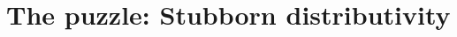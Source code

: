 \documentclass[linguex]{sp}
\begin{document}
\section{The puzzle: Stubborn distributivity}

%
%
%
%
%
%
\end{document}
